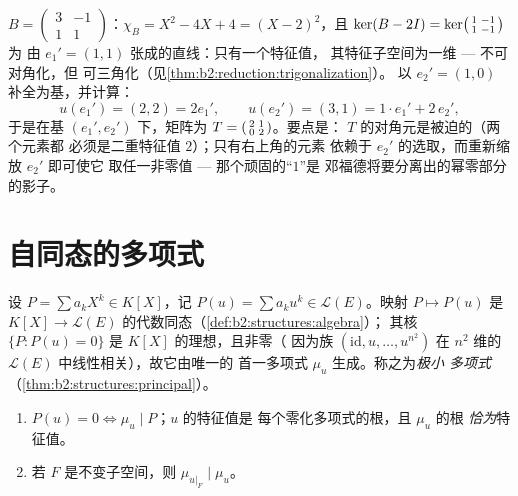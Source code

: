 \begin{example}[手工三角化]\label{ex:b2:reduction:trigwork}
$B = \begin{pmatrix}3 & -1\\ 1 & 1\end{pmatrix}$：$\chi_B = X^2 -
4X + 4 = (X - 2)^2$，且 $\ker(B - 2I) =
\ker\begin{psmallmatrix}1 & -1\\ 1 & -1\end{psmallmatrix}$ 为
由 $e_1' = (1, 1)$ 张成的直线：只有一个特征值，
其特征子空间为一维 --- 不可对角化，但
可三角化（见\cref{thm:b2:reduction:trigonalization}）。
以 $e_2' = (1, 0)$ 补全为基，并计算：
\[
u(e_1') = (2, 2) = 2e_1',
\qquad
u(e_2') = (3, 1) = 1\cdot e_1' + 2\, e_2' ,
\]
于是在基 $(e_1', e_2')$ 下，矩阵为 $T =
\begin{psmallmatrix}2 & 1\\ 0 & 2\end{psmallmatrix}$。要点是：
$T$ 的对角元是被迫的（两个元素都
必须是二重特征值 $2$）；只有右上角的元素
依赖于 $e_2'$ 的选取，而重新缩放 $e_2'$ 即可使它
取任一非零值 --- 那个顽固的“$1$”是
邓福德将要分离出的幂零部分的影子。
\end{example}

\section{自同态的多项式}

\begin{definition}\label{def:b2:reduction:polyu}
设 $P = \sum a_k X^k \in K[X]$，记 $P(u) = \sum a_k u^k \in
\mathcal{L}(E)$。映射 $P \mapsto P(u)$ 是
$K[X] \to \mathcal{L}(E)$ 的代数同态（\cref{def:b2:structures:algebra}）；
其核 $\{P : P(u) = 0\}$ 是 $K[X]$ 的理想，且非零（
因为族 $(\mathrm{id}, u, \dots, u^{n^2})$ 在
$n^2$ 维的 $\mathcal{L}(E)$ 中线性相关），故它由唯一的
首一多项式 $\mu_u$ 生成。称之为\emph{极小
多项式}
（\cref{thm:b2:structures:principal}）。
\end{definition}

\begin{proposition}\label{prop:b2:reduction:minpoly}
\begin{enumerate}
  \item $P(u) = 0 \iff \mu_u \mid P$；$u$ 的特征值是
        每个零化多项式的根，且 $\mu_u$ 的根
        \emph{恰为}特征值。
  \item 若 $F$ 是不变子空间，则 $\mu_{u|_F} \mid \mu_u$。
\end{enumerate}
\end{proposition}

